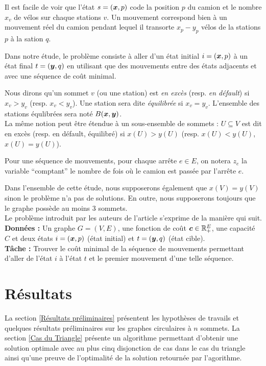 \documentclass[twoside,11pt,openany,a4paper]{rapport}
\begin{document}
Il est facile de voir que l'état $s=(\boldsymbol{x},p)$ code la position $p$ du camion et le nombre $x_v$ de vélos sur chaque stations $v$. Un mouvement correspond bien à un mouvement réel du camion pendant lequel il transorte $x_p-y_p$ vélos de la stations $p$ à la sation $q$.

Dans notre étude, le problème consiste à aller d'un état initial $i=(\boldsymbol{x},p)$ à un état final $t=(\boldsymbol{y},q)$ en utilisant que des mouvements entre des états adjacents et avec une séquence de coût minimal.

Nous dirons qu'un sommet $v$ (ou une station) est \emph{en excès} (resp. \emph{en défault}) si $x_v > y_v$ (resp. $x_v < y_v$). Une station sera dite \emph{équilibrée} si $x_v=y_v$. L'ensemble des stations équlibrées sera noté $B(\boldsymbol{x},\boldsymbol{y})$.
\\
La même notion peut être étendue à un sous-ensemble de sommets : $U \subseteq V$ est dit en excès (resp. en défault, équilibré) si $x(U) > y(U)$ (resp. $x(U) < y(U)$, $x(U) = y(U)$).

Pour une séquence de mouvements, pour chaque arrête $e \in E$, on notera $z_e$ la variable ``comptant'' le nombre de fois où le camion est passée par l'arrête $e$.

Dans l'ensemble de cette étude, nous supposerons également que $x(V) = y(V)$ sinon le problème n'a pas de solutions. En outre, nous supposerons toujours que le graphe possède au moins 3 sommets.
\\

Le problème introduit par les auteurs de l'article \cite{Benchimol2011} s'exprime de la manière qui suit.
\\
\textbf{Données :} Un graphe $G=(V,E)$, une fonction de coût $\boldsymbol{c} \in \mathbb{R}^E_+$, une capacité $C$ et deux états $i=(\boldsymbol{x},p)$ (état initial) et $t=(\boldsymbol{y},q)$ (état cible).
\\
\textbf{Tâche :} Trouver le coût minimal de la séquence de mouvements permettant d'aller de l'état $i$ à l'état $t$ et le premier mouvement d'une telle séquence.

\section{Résultats}

La section \ref{Résultats préliminaires} présentent les hypothèses de travails et quelques résultats préliminaires sur les graphes circulaires à $n$ sommets. La section \ref{Cas du Triangle} présente un algorithme permettant d'obtenir une solution optimale avec au plus cinq disjonction de cas dans le cas du triangle ainsi qu'une preuve de l'optimalité de la solution retournée par l'agorithme.
\end{document}
